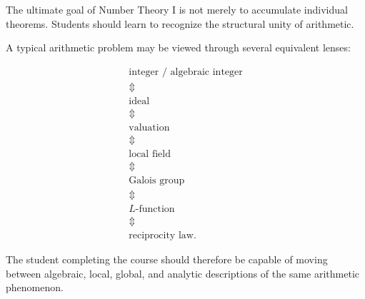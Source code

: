 \documentclass[11pt,a4paper]{article}
\begin{document}
The ultimate goal of Number Theory I is not merely to accumulate
individual theorems.  Students should learn to recognize the
structural unity of arithmetic.

A typical arithmetic problem may be viewed through several
equivalent lenses:

\[
\boxed{
\begin{array}{c}
\text{integer / algebraic integer}
\\
\Updownarrow
\\
\text{ideal}
\\
\Updownarrow
\\
\text{valuation}
\\
\Updownarrow
\\
\text{local field}
\\
\Updownarrow
\\
\text{Galois group}
\\
\Updownarrow
\\
\text{\(L\)-function}
\\
\Updownarrow
\\
\text{reciprocity law}.
\end{array}
}
\]

The student completing the course should therefore be capable of
moving between algebraic, local, global, and analytic descriptions
of the same arithmetic phenomenon.
\end{document}
